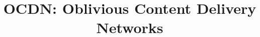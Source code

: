 \documentclass[runningheads]{llncs}
\begin{document}
 









  \title{ OCDN: Oblivious Content Delivery Networks}
  
  \author{} 
  \institute{}


 


 

\maketitle














\clearpage
{\footnotesize 
}
\end{document}
